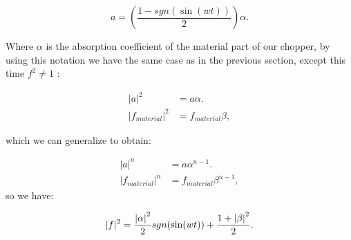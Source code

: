 \documentclass[12pt]{book}
\begin{document}
\vspace{0.5cm}
\begin{equation}
a=\left(\frac{1-sgn(\sin(wt))}{2}\right) \alpha.
\end{equation}
\vspace{0.5cm}

Where $\alpha$ is the absorption coefficient of the material part of our chopper, by using this notation we have the same case as in the previous section, except this time $f^2 \neq 1$ :

\begin{align}
|a|^2&=a \alpha.\\
|f_{material}|^2&=f_{material} \beta,
\end{align}

which we can generalize to obtain:

\begin{align}
|a|^n&=a\alpha^{n-1}.\\
|f_{material}|^n&=f_{material} \beta^{n-1},
\end{align}
so we have:

\begin{equation}
|f|^2=  \frac{\abs{\alpha}^2}{2} sgn(\sin(wt)) +\frac{1+\abs{\beta}^2}{2}.
\end{equation}
\end{document}
